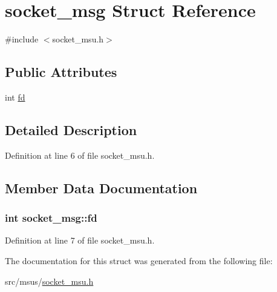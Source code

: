\hypertarget{structsocket__msg}{\section{socket\-\_\-msg Struct Reference}
\label{structsocket__msg}
}


{\ttfamily \#include $<$socket\-\_\-msu.\-h$>$}

\subsection*{Public Attributes}
\begin{DoxyCompactItemize}
\item 
int \hyperlink{structsocket__msg_a4c30ca4c5a5cfa381a6f7b3e256ca0aa}{fd}
\end{DoxyCompactItemize}


\subsection{Detailed Description}


Definition at line 6 of file socket\-\_\-msu.\-h.



\subsection{Member Data Documentation}
\hypertarget{structsocket__msg_a4c30ca4c5a5cfa381a6f7b3e256ca0aa}{
\subsubsection[{fd}]{\setlength{\rightskip}{0pt plus 5cm}int socket\-\_\-msg\-::fd}}\label{structsocket__msg_a4c30ca4c5a5cfa381a6f7b3e256ca0aa}


Definition at line 7 of file socket\-\_\-msu.\-h.



The documentation for this struct was generated from the following file\-:\begin{DoxyCompactItemize}
\item 
src/msus/\hyperlink{socket__msu_8h}{socket\-\_\-msu.\-h}\end{DoxyCompactItemize}
